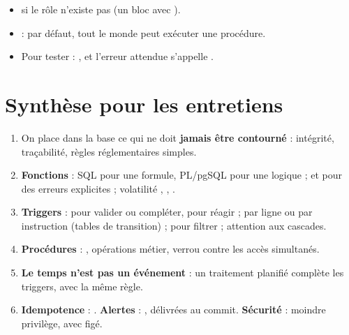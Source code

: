 \begin{indice}
\begin{itemize}
\item {} si le rôle n'existe pas (un bloc  avec
).
\item {} : par défaut, tout le monde peut exécuter une
procédure.
\item Pour tester : , et l'erreur attendue s'appelle
.
\end{itemize}
\end{indice}

\section{Synthèse pour les entretiens}

\begin{resume}
\begin{enumerate}
\item On place dans la base ce qui ne doit \textbf{jamais être contourné} : intégrité, traçabilité,
règles réglementaires simples.
\item \textbf{Fonctions} : SQL pour une formule, PL/pgSQL pour une logique ;  et
 pour des erreurs explicites ; volatilité , ,
.
\item \textbf{Triggers} :  pour valider ou compléter,  pour réagir ; par ligne ou
par instruction (tables de transition) ;  pour filtrer ; attention aux cascades.
\item \textbf{Procédures} : , opérations métier, verrou  contre les accès
simultanés.
\item \textbf{Le temps n'est pas un événement} : un traitement planifié complète les triggers, avec la
même règle.
\item \textbf{Idempotence} : . \textbf{Alertes} : , délivrées
au commit. \textbf{Sécurité} : moindre privilège,  avec  figé.
\end{enumerate}
\end{resume}

